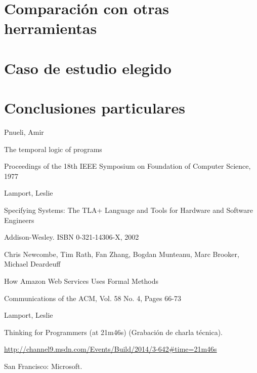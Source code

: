 \documentclass[spanish]{llncs}
\begin{document}
\section{Comparación con otras herramientas}


\section{Caso de estudio elegido}


\section{Conclusiones particulares}


%
%
\begin{thebibliography}{5}
%
Pnueli, Amir

The temporal logic of programs

Proceedings of the 18th IEEE Symposium on Foundation of Computer Science, 1977

Lamport, Leslie

Specifying Systems: The TLA+ Language and Tools for Hardware and Software Engineers

Addison-Wesley. ISBN 0-321-14306-X, 2002

Chris Newcombe, Tim Rath, Fan Zhang, Bogdan Munteanu, Marc Brooker, Michael Deardeuff 

How Amazon Web Services Uses Formal Methods

Communications of the ACM, Vol. 58 No. 4, Pages 66-73

Lamport, Leslie 

Thinking for Programmers (at 21m46s) (Grabación de charla técnica). 

\url{http://channel9.msdn.com/Events/Build/2014/3-642#time=21m46s}

San Francisco: Microsoft.

\end{thebibliography}

\clearpage
\end{document}
